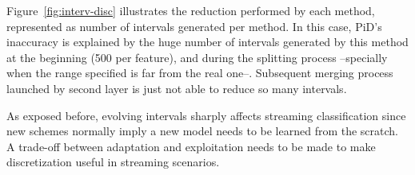 \documentclass[preprint,12pt]{elsarticle}
\begin{document}
Figure~\ref{fig:interv-disc} illustrates the reduction performed by each method, represented as number of intervals generated per method. In this case, PiD's inaccuracy is explained by the huge number of intervals generated by this method at the beginning (500 per feature), and during the splitting process --specially when the range specified is far from the real one--. Subsequent merging process launched by second layer is just not able to reduce so many intervals.

As exposed before, evolving intervals sharply affects streaming classification since new schemes normally imply a new model needs to be learned from the scratch. A trade-off between adaptation and exploitation needs to be made to make discretization useful in streaming scenarios.


\end{document}
